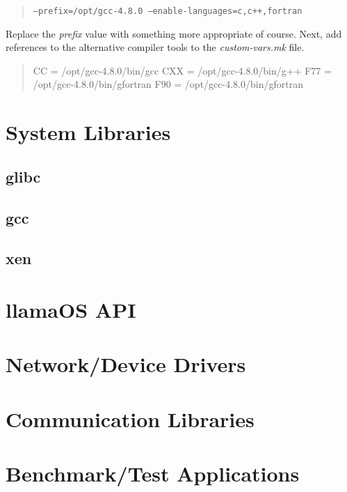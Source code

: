 \documentclass[draft]{article}
\begin{document}
\begin{quote}
\texttt{--prefix=/opt/gcc-4.8.0 --enable-languages=c,c++,fortran}
\end{quote}

Replace the \emph{prefix} value with something more appropriate of course.  
Next, add references to the alternative compiler tools to the 
\emph{custom-vars.mk} file.

\begin{quote}
CC = /opt/gcc-4.8.0/bin/gcc\newline
CXX = /opt/gcc-4.8.0/bin/g++\newline
F77 = /opt/gcc-4.8.0/bin/gfortran\newline
F90 = /opt/gcc-4.8.0/bin/gfortran
\end{quote}


\section{System Libraries}

\subsection{glibc}
\subsection{gcc}
\subsection{xen}

\section{llamaOS API}

\section{Network/Device Drivers}

\section{Communication Libraries}

\section{Benchmark/Test Applications}
\end{document}
